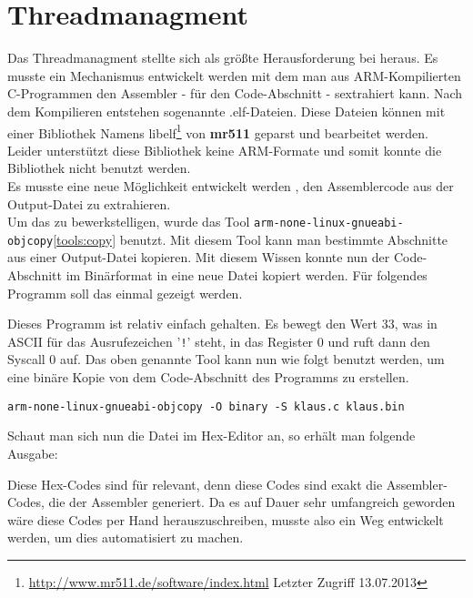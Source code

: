 \section{Threadmanagment}
Das Threadmanagment stellte sich als gr\"o\ss te Herausforderung bei \mops heraus. Es musste ein Mechanismus entwickelt werden mit dem man aus ARM-Kompilierten C-Programmen den Assembler - f\"ur den Code-Abschnitt - sextrahiert kann. Nach dem Kompilieren entstehen sogenannte .elf-Dateien. Diese Dateien k\"onnen mit einer Bibliothek Namens libelf\footnote{\url{http://www.mr511.de/software/index.html} Letzter Zugriff 13.07.2013} von \textbf{mr511} geparst und bearbeitet werden. Leider unterst\"utzt diese Bibliothek keine ARM-Formate und somit konnte die Bibliothek nicht benutzt werden.\\
Es musste eine neue M\"oglichkeit entwickelt werden , den Assemblercode aus der Output-Datei zu extrahieren.\\
Um das zu bewerkstelligen, wurde das Tool \texttt{arm-none-linux-gnueabi-objcopy}\ref{tools:copy} benutzt. Mit diesem Tool kann man bestimmte Abschnitte aus einer Output-Datei kopieren. Mit diesem Wissen konnte nun der Code-Abschnitt im Bin\"arformat in eine neue Datei kopiert werden. F\"ur folgendes Programm soll das einmal gezeigt werden.

Dieses Programm ist relativ einfach gehalten. Es bewegt den Wert 33, was in ASCII f\"ur das Ausrufezeichen '\texttt{!}' steht, in das Register 0 und ruft dann den Syscall 0 auf.
Das oben genannte Tool kann nun wie folgt benutzt werden, um eine bin\"are Kopie von dem Code-Abschnitt des Programms zu erstellen.
\begin{lstlisting}
arm-none-linux-gnueabi-objcopy -O binary -S klaus.c klaus.bin
\end{lstlisting}
Schaut man sich nun die Datei im Hex-Editor an, so erh\"alt man folgende Ausgabe:

Diese Hex-Codes sind f\"ur \mops relevant, denn diese Codes sind exakt die Assembler-Codes, die der Assembler generiert. Da es auf Dauer sehr umfangreich geworden w\"are diese Codes per Hand herauszuschreiben, musste also ein Weg entwickelt werden, um dies automatisiert zu machen.
